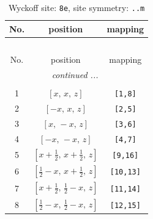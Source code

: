 \documentclass[fleqn,8pt]{jsarticle}
\begin{document}
\renewcommand{\arraystretch}{1.2}
\begin{longtable}{ccc}
\caption{Wyckoff site: {\tt 8e}, site symmetry: {\tt ..m}}
 \\
 \hline \hline
No. & position & mapping \\ \hline \endfirsthead

\multicolumn{2}{l}{\tablename\ \thetable{}} \\
 \hline \hline
No. & position & mapping \\ \hline \endhead

 \hline \hline
\multicolumn{2}{r}{\footnotesize\it continued ...} \\ \endfoot

 \hline \hline
\multicolumn{2}{r}{} \\ \endlastfoot

1 & $\left[ x,\, x,\, z \right]$ & {\tt [1,8]} \\ \hline
2 & $\left[ - x,\, x,\, z \right]$ & {\tt [2,5]} \\ \hline
3 & $\left[ x,\, - x,\, z \right]$ & {\tt [3,6]} \\ \hline
4 & $\left[ - x,\, - x,\, z \right]$ & {\tt [4,7]} \\ \hline
5 & $\left[ x + \frac{1}{2},\, x + \frac{1}{2},\, z \right]$ & {\tt [9,16]} \\ \hline
6 & $\left[ \frac{1}{2} - x,\, x + \frac{1}{2},\, z \right]$ & {\tt [10,13]} \\ \hline
7 & $\left[ x + \frac{1}{2},\, \frac{1}{2} - x,\, z \right]$ & {\tt [11,14]} \\ \hline
8 & $\left[ \frac{1}{2} - x,\, \frac{1}{2} - x,\, z \right]$ & {\tt [12,15]} \\
\end{longtable}
\renewcommand{\arraystretch}{1.2}
\end{document}
